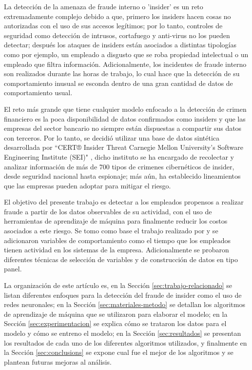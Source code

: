 \documentclass[runningheads]{llncs}
\begin{document}
La detección de la amenaza de fraude interno o 'insider' es un reto extremadamente complejo debido a que, primero los insiders hacen cosas no autorizadas con el uso de sus accesos legítimos; por lo tanto, controles de seguridad como detección de intrusos, cortafuego y anti-virus no los pueden detectar; después los ataques de insiders están asociados a distintas tipologías como por ejemplo, un empleado a disgusto que se roba propiedad intelectual o un empleado que filtra información. Adicionalmente, los incidentes de fraude interno son realizados durante las horas de trabajo, lo cual hace que la detección de su comportamiento inusual se esconda dentro de una gran cantidad de datos de comportamiento usual. 

El reto más grande que tiene cualquier modelo enfocado a la detección de crimen financiero es la poca disponibilidad de datos confirmados como insiders y que las empresas del sector bancario no siempre están dispuestas a compartir sus datos con terceros. Por lo tanto, se decidió utilizar una base de datos sintética desarrollada por ``CERT® Insider Threat Carnegie Mellon University's Software Engineering Institute (SEI)" \cite{CERT_home}, dicho instituto se ha encargado de recolectar y analizar información de más de 700 tipos de crimenes cibernéticos de insider, desde seguridad nacional hasta espionaje; más aún, ha establecido lineamientos que las empresas pueden adoptar para mitigar el riesgo.

El objetivo del presente trabajo es detectar a los empleados propensos a realizar fraude a partir de los datos observables de su actividad, con el uso de herramientas de aprendizaje de máquina para finalmente reducir los costos asociados a este riesgo. Se tomo como base el trabajo realizado por \cite{noever2019classifier} y se adicionaron variables de comportamiento como el tiempo que los empleados tienen actividad en los sistemas de la empresa. Adicionalmente se probaron diferentes técnicas de selección de variables y de construcción de datos en tipo panel.

La organización de este artículo es, en la Sección \ref{sec:trabajo-relacionado} se listan diferentes enfoques para la detección del fraude de insider como el uso de redes neuronales; en la Sección \ref{sec:materiales-metodo} se detallan los algoritmos de aprendizaje de máquina que se utilizaron para elaborar el modelo; en la Sección \ref{sec:experimentacion} se explica cómo se trataron los datos para el modelo y cómo se entreno el modelo; en la Sección \ref{sec:resultados} se presentan los resultados de cada uno de los diferentes algoritmos utilizados, y finalmente en la Sección \ref{sec:conclusions} se expone cual fue el mejor de los algoritmos y se plantean futuras mejoras al análisis.
\end{document}
